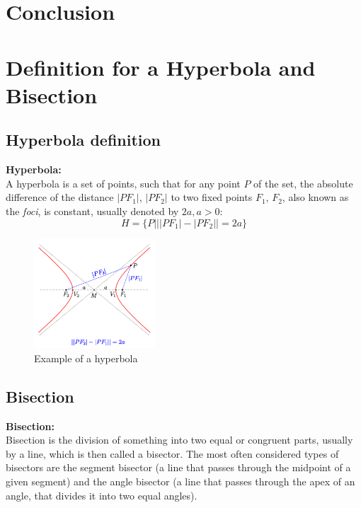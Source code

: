 \chapter{Conclusion}



\newpage

\appendix

\chapter{Definition for a Hyperbola and Bisection}

\section{Hyperbola definition}

\begin{mydef}
	\textbf{Hyperbola:} \\ 
	A hyperbola\cite{Hyperbola} is a set of
	points, such that for any point $P$ of the set, the absolute difference of
	the distance $|PF_1|$, $|PF_2|$ to two fixed points $F_1$, $F_2$, also known
	as the \textit{foci}, is constant, usually denoted by $2a, a>0$:
	$$H=\{P|||PF_1|-|PF_2||=2a\}$$ 
\end{mydef}

\begin{figure}[H] 
	\centering
	\includegraphics[width=0.4\textwidth]{figures/hyperbel-def-e.png} 
	\caption{Example of a hyperbola} 
	\label{fig:hyperbola} 
\end{figure}

\section{Bisection}

\begin{mydef}
	\textbf{Bisection:} \\ 
	Bisection is the division of something into
	two equal or congruent parts, usually by a line, which is then called a
	bisector. The most often considered types of bisectors are the segment
	bisector (a line that passes through the midpoint of a given segment) and
	the angle bisector (a line that passes through the apex of an angle, that
	divides it into two equal angles).\cite{Bisector-collinearity-convexPoly}
\end{mydef}

